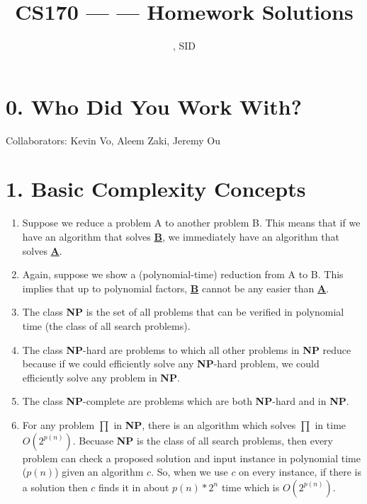 \documentclass[11pt]{article}
\title{CS170 --- \Session --- Homework \Homework \space Solutions}
\author{\Name, SID \SID}
\date{}
\begin{document}
\maketitle

\section*{0. Who Did You Work With?}

Collaborators: Kevin Vo, Aleem Zaki, Jeremy Ou



\newpage
\section*{1. Basic Complexity Concepts}
\begin{enumerate}[label=(\alph*)]
\item
Suppose we reduce a problem A to another problem B. This means that if we have an algorithm that solves \underline{\textbf{B}}, we immediately have an algorithm that solves \underline{\textbf{A}}.



\item
Again, suppose we show a (polynomial-time) reduction from A to B. This implies that up to polynomial factors, \underline{\textbf{B}} cannot be any easier than \underline{\textbf{A}}.



\item
The class \textbf{NP} is the set of all problems that can be verified in polynomial time (the class of all search problems).



\item
The class \textbf{NP}-hard are problems to which all other problems in \textbf{NP} reduce because if we could efficiently solve any \textbf{NP}-hard problem, we could efficiently solve any problem in \textbf{NP}.



\item
The class \textbf{NP}-complete are problems which are both \textbf{NP}-hard and in \textbf{NP}.



\item
For any problem \textbf{$\prod$} in \textbf{NP}, there is an algorithm which solves \textbf{$\prod$} in time $O(2^{p(n)})$. Becuase \textbf{NP} is the class of all search problems, then every problem can check a proposed solution and input instance in polynomial time ($p(n)$) given an algorithm $c$. So, when we use $c$ on every instance, if there is a solution then $c$ finds it in about $p(n) * 2^n$ time which is $O(2^{p(n)})$.
\end{enumerate}
\end{document}
